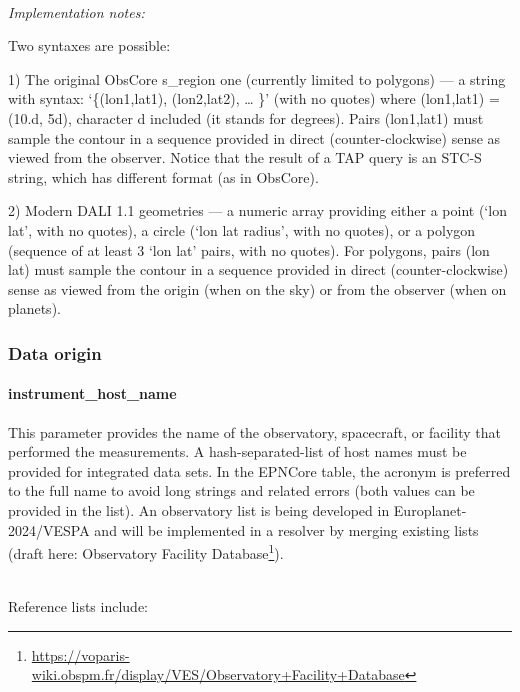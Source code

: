 \documentclass[11pt,a4paper]{ivoa}
\begin{document}
\textbf{\\}
\emph{Implementation notes:}

Two syntaxes are possible:

1) The original ObsCore s\_region one (currently limited to polygons)
— a string with syntax: `\{(lon1,lat1), (lon2,lat2), … \}' (with
no quotes) where (lon1,lat1) = (10.d, 5d), character d included (it
stands for degrees). Pairs (lon1,lat1) must sample the contour in a
sequence provided in direct (counter-clockwise) sense as viewed from
the observer. Notice that the result of a TAP query is an STC-S string,
which has different format (as in ObsCore).

2) Modern DALI 1.1 geometries — a numeric array providing either a point
(`lon lat', with no quotes), a circle (`lon lat radius', with no quotes),
or a polygon (sequence of at least 3 `lon lat' pairs, with no quotes). For
polygons, pairs (lon lat) must sample the contour in a sequence provided
in direct (counter-clockwise) sense as viewed from the origin (when on
the sky) or from the observer (when on planets).

\subsubsection{Data origin}

\paragraph{instrument\_host\_name}

This parameter provides the name of the observatory, spacecraft, or
facility that performed the measurements. A hash-separated-list of host
names must be provided for integrated data sets. In the EPNCore table, the
acronym is preferred to the full name to avoid long strings and related
errors (both values can be provided in the list). An observatory list
is being developed in Europlanet-2024/VESPA and will be implemented in
a resolver by merging existing lists (draft here: Observatory Facility
Database\footnote{\url{https://voparis-wiki.obspm.fr/display/VES/Observatory+Facility+Database}}).

\textbf{\\}
Reference lists include:
\end{document}
